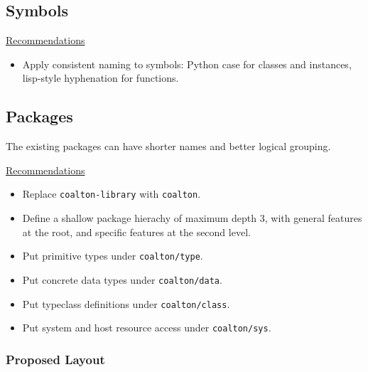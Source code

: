 \documentclass[12pt]{article}
\newcommand{\code}{\texttt}
\begin{document}
\subsection{Symbols}

\bigskip
\underline{Recommendations}
\begin{itemize}
\item Apply consistent naming to symbols: Python case for classes and
  instances, lisp-style hyphenation for functions.
\end{itemize}

\subsection{Packages}

The existing packages can have shorter names and better logical grouping.

\bigskip
\underline{Recommendations}
\begin{itemize}
\item Replace \code{coalton-library} with \code{coalton}.
\item Define a shallow package hierachy of maximum depth 3, with
  general features at the root, and specific features at the second
  level.
\item Put primitive types under \code{coalton/type}.
\item Put concrete data types under \code{coalton/data}.
\item Put typeclass definitions under \code{coalton/class}.
\item Put system and host resource access under \code{coalton/sys}.
\end{itemize}

\subsubsection{Proposed Layout}

\begin{itemize}
\item coalton
\item coalton/class
\item coalton/class/iterator, monad
\item coalton/class/monad
\item coalton/data
\item coalton/data/array, hash, list, map, queue, seq, tree, tuple, vector
\item coalton/function
\item coalton/math
\item coalton/mutable
\item coalton/sys
\item coalton/sys/{file
\item coalton/type
\item coalton/type/bit, byte, char, string
\end {itemize}
\end{document}
